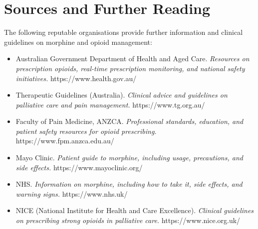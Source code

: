\section*{Sources and Further Reading}
The following reputable organisations provide further information and clinical guidelines on morphine and opioid management:
\begin{itemize}
    \item Australian Government Department of Health and Aged Care. \textit{Resources on prescription opioids, real-time prescription monitoring, and national safety initiatives.} https://www.health.gov.au/
    \item Therapeutic Guidelines (Australia). \textit{Clinical advice and guidelines on palliative care and pain management.} https://www.tg.org.au/
    \item Faculty of Pain Medicine, ANZCA. \textit{Professional standards, education, and patient safety resources for opioid prescribing.} https://www.fpm.anzca.edu.au/
    \item Mayo Clinic. \textit{Patient guide to morphine, including usage, precautions, and side effects.} https://www.mayoclinic.org/
    \item NHS. \textit{Information on morphine, including how to take it, side effects, and warning signs.} https://www.nhs.uk/
    \item NICE (National Institute for Health and Care Excellence). \textit{Clinical guidelines on prescribing strong opioids in palliative care.} https://www.nice.org.uk/
\end{itemize}
